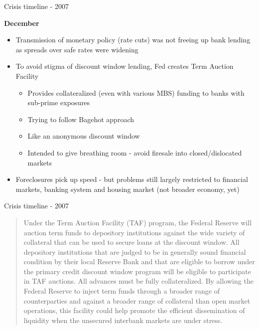 \begin{frame}{Crisis timeline - 2007}

\textbf{December}
	\begin{itemize}
	\item	Transmission of monetary policy (rate cuts) was not freeing up bank lending as spreads over safe rates were widening
	\item	To avoid stigma of discount window lending, Fed creates Term Auction Facility
		\begin{itemize}
		\item	Provides collateralized (even with various MBS) funding to banks with sub-prime exposures
		\item	Trying to follow Bagehot approach
		\item	Like an anonymous discount window
		\item	Intended to give breathing room - avoid firesale into closed/dislocated markets
		\end{itemize}
	\item	Foreclosures pick up speed - but problems still largely restricted to financial markets, banking system and housing market (not broader economy, yet)
	\end{itemize}

\end{frame}



\begin{frame}{Crisis timeline - 2007}

\begin{quote}
Under the Term Auction Facility (TAF) program, the Federal Reserve will auction term funds to depository institutions against the wide variety of collateral that can be used to secure loans at the discount window.  All depository institutions that are judged to be in generally sound financial condition by their local Reserve Bank and that are eligible to borrow under the primary credit discount window program will be eligible to participate in TAF auctions.  All advances must be fully collateralized.  By allowing the Federal Reserve to inject term funds through a broader range of counterparties and against a broader range of collateral than open market operations, this facility could help promote the efficient dissemination of liquidity when the unsecured interbank markets are under stress.
\end{quote}

\end{frame}

